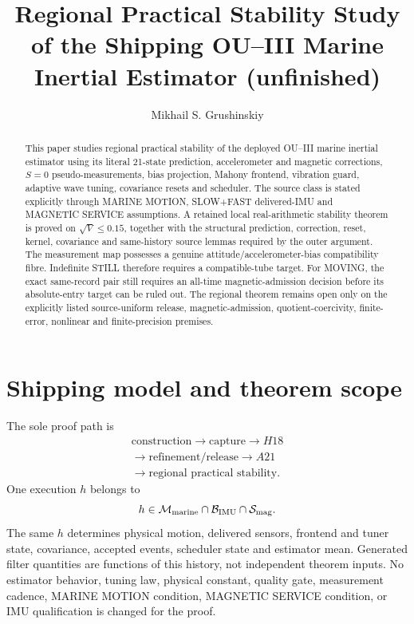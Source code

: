 \documentclass[journal]{IEEEtran}
\title{Regional Practical Stability Study of the Shipping OU--III Marine Inertial Estimator (unfinished)}
\author{Mikhail S. Grushinskiy}
\begin{document}
\maketitle

\begin{abstract}
This paper studies regional practical stability of the deployed OU--III marine
inertial estimator using its literal 21-state prediction, accelerometer and
magnetic corrections, $S=0$ pseudo-measurements, bias projection, Mahony
frontend, vibration guard, adaptive wave tuning, covariance resets and
scheduler.  The source class is stated explicitly through MARINE MOTION,
SLOW+FAST delivered-IMU and MAGNETIC SERVICE assumptions.  A retained local
real-arithmetic stability theorem is proved on $\sqrt V\le0.15$, together
with the structural prediction, correction, reset, kernel, covariance and
same-history source lemmas required by the outer argument.  The measurement
map possesses a genuine attitude/accelerometer-bias compatibility fibre.
Indefinite STILL therefore requires a compatible-tube target. For MOVING,
the exact same-record pair still requires an all-time magnetic-admission
decision before its absolute-entry target can be ruled out.  The regional
theorem remains open only on the explicitly listed source-uniform release,
magnetic-admission, quotient-coercivity, finite-error, nonlinear and
finite-precision premises.
\end{abstract}

\section{Shipping model and theorem scope}
The sole proof path is
\[
\begin{gathered}
\text{construction}\to\text{capture}\to H18\\
\to\text{refinement/release}\to A21\\
\to\text{regional practical stability}.
\end{gathered}
\]
One execution \(h\) belongs to
\[
h\in{\cal M}_{\rm marine}\cap{\cal B}_{\rm IMU}\cap{\cal S}_{\rm mag}.
\]
The same \(h\) determines physical motion, delivered sensors, frontend and tuner state, covariance, accepted events, scheduler state and estimator mean. Generated filter quantities are functions of this history, not independent theorem inputs. No estimator behavior, tuning law, physical constant, quality gate, measurement cadence, MARINE MOTION condition, MAGNETIC SERVICE condition, or IMU qualification is changed for the proof.
\end{document}
